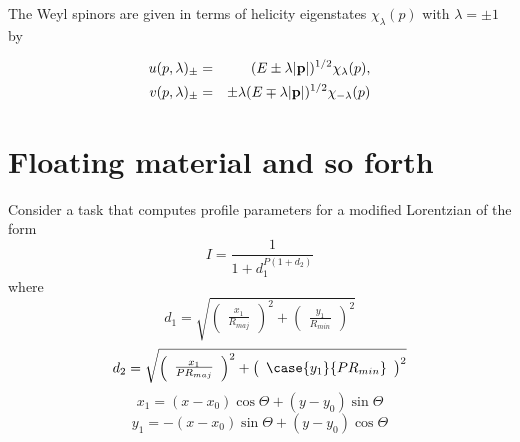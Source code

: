 \documentclass[manuscript]{aastex}
\begin{document}

The Weyl spinors are given in terms of helicity eigenstates
$\chi_\lambda(p)$ with $\lambda=\pm1$ by
\begin{mathletters}
\begin{eqnarray}
u(p,\lambda)_\pm & = & (E\pm\lambda|{\bf p}|)^{1/2}\chi_\lambda(p) , \\
v(p,\lambda)_\pm & = & \pm\lambda(E\mp\lambda|{\bf p}|)^{1/2}\chi
_{-\lambda}(p)
\end{eqnarray}
\end{mathletters}


\section{Floating material and so forth}


Consider a task that computes profile parameters for a modified
Lorentzian of the form
\begin{equation}
I = \frac{1}{1 + d_{1}^{P (1 + d_{2} )}}
\end{equation}
where
\begin{displaymath}
d_{1} = \sqrt{ \left( \begin{array}{c} \frac{x_{1}}{R_{maj}}
\end{array} \right) ^{2} +
\left( \begin{array}{c} \frac{y_{1}}{R_{min}} \end{array} \right) ^{2} }
\end{displaymath}
\begin{displaymath}
d_{2} = \sqrt{ \left( \begin{array}{c} \frac{x_{1}}{P R_{maj}}
\end{array} \right) ^{2} +
\left( \begin{array}{c} \case{y_{1}}{P R_{min}} \end{array} \right) ^{2} }
\end{displaymath}
\begin{displaymath}
x_{1} = (x - x_{0}) \cos \Theta + (y - y_{0}) \sin \Theta
\end{displaymath}
\begin{displaymath}
y_{1} = -(x - x_{0}) \sin \Theta + (y - y_{0}) \cos \Theta
\end{displaymath}
\end{document}
